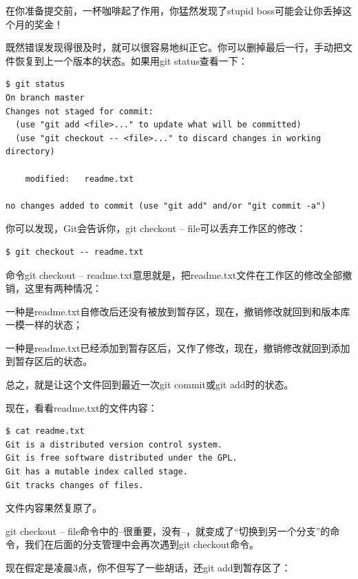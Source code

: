 在你准备提交前，一杯咖啡起了作用，你猛然发现了stupid boss可能会让你丢掉这个月的奖金！

既然错误发现得很及时，就可以很容易地纠正它。你可以删掉最后一行，手动把文件恢复到上一个版本的状态。如果用git status查看一下：

\begin{verbatim}
$ git status
On branch master
Changes not staged for commit:
  (use "git add <file>..." to update what will be committed)
  (use "git checkout -- <file>..." to discard changes in working directory)

	modified:   readme.txt

no changes added to commit (use "git add" and/or "git commit -a")
\end{verbatim}

你可以发现，Git会告诉你，git checkout -- file可以丢弃工作区的修改：

\begin{verbatim}
$ git checkout -- readme.txt
\end{verbatim}

命令git checkout -- readme.txt意思就是，把readme.txt文件在工作区的修改全部撤销，这里有两种情况：

一种是readme.txt自修改后还没有被放到暂存区，现在，撤销修改就回到和版本库一模一样的状态；

一种是readme.txt已经添加到暂存区后，又作了修改，现在，撤销修改就回到添加到暂存区后的状态。

总之，就是让这个文件回到最近一次git commit或git add时的状态。

现在，看看readme.txt的文件内容：

\begin{verbatim}
$ cat readme.txt
Git is a distributed version control system.
Git is free software distributed under the GPL.
Git has a mutable index called stage.
Git tracks changes of files.
\end{verbatim}

文件内容果然复原了。

git checkout -- file命令中的--很重要，没有--，就变成了“切换到另一个分支”的命令，我们在后面的分支管理中会再次遇到git checkout命令。

现在假定是凌晨3点，你不但写了一些胡话，还git add到暂存区了：

